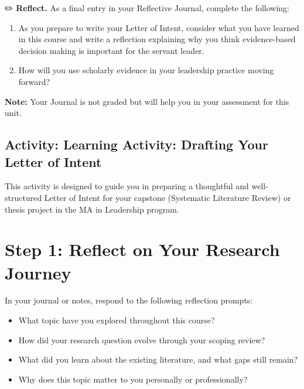 \documentclass[
  letterpaper,
  DIV=11,
  numbers=noendperiod]{scrreprt}
\providecommand{\tightlist}{%
  \setlength{\itemsep}{0pt}\setlength{\parskip}{0pt}}\usepackage{longtable,booktabs,array}
\begin{document}
✏️ \textbf{Reflect.} As a final entry in your Reflective Journal,
complete the following:

\begin{enumerate}
\def\labelenumi{\arabic{enumi}.}
\tightlist
\item
  As you prepare to write your Letter of Intent, consider what you have
  learned in this course and write a reflection explaining why you think
  evidence-based decision making is important for the servant leader.
\item
  How will you use scholarly evidence in your leadership practice moving
  forward?
\end{enumerate}

\textbf{Note:} Your Journal is not graded but will help you in your
assessment for this unit.

\subsection*{Activity: Learning Activity: Drafting Your Letter of
Intent}\label{activity-learning-activity-drafting-your-letter-of-intent}

This activity is designed to guide you in preparing a thoughtful and
well-structured Letter of Intent for your capstone (Systematic
Literature Review) or thesis project in the MA in Leadership program.

\section*{Step 1: Reflect on Your Research
Journey}\label{step-1-reflect-on-your-research-journey}


In your journal or notes, respond to the following reflection prompts:

\begin{itemize}
\tightlist
\item
  What topic have you explored throughout this course?
\item
  How did your research question evolve through your scoping review?
\item
  What did you learn about the existing literature, and what gaps still
  remain?
\item
  Why does this topic matter to you personally or professionally?
\end{itemize}
\end{document}
